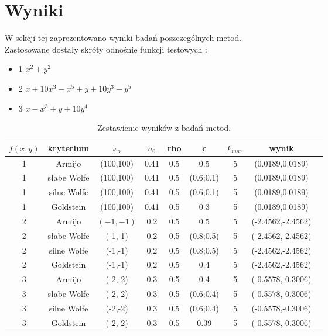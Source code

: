 \documentclass{classrep}
\begin{document}
\section{Wyniki}
W sekcji tej zaprezentowano wyniki badań poszczególnych metod.\\
Zastosowane dostały skróty odnośnie funkcji testowych :
\begin{itemize}
\item 1 $x^2+y^2$
\item 2 $x+10x^3-x^5 +y+10y^3-y^5$
\item 3 $x-x^3 +y+10y^4$
\end{itemize}


	\begin{table}[H]
		\begin{center}
\begin{tabular}{|c|c|c|c|c|c|c|c|c}
\hline $f(x,y)$ & kryterium & $x_o$ & $a_0$ & rho & c & $k_{max}$ & wynik\\ 
\hline 1 & Armijo & (100,100) & 0.41 & 0.5 & 0.5 & 5 &  (0.0189,0.0189) \\ 
\hline 1 & słabe Wolfe & (100,100) & 0.41 & 0.5 & (0.6;0.1) & 5 & (0.0189,0.0189) \\
\hline 1 & silne Wolfe & (100,100) & 0.41 & 0.5 & (0.6;0.1) & 5 & (0.0189,0.0189) \\
\hline 1 & Goldstein & (100,100) & 0.41 & 0.5 & 0.3 & 5 & (0.0189,0.0189) \\
\hline 2 & Armijo & $(-1,-1)$ & 0.2 & 0.5 & 0.5 & 5 &(-2.4562,-2.4562) \\ 
\hline 2 & słabe Wolfe & (-1,-1) & 0.2 & 0.5 & (0.8;0.5) & 5 &(-2.4562,-2.4562) \\ 
\hline 2 & silne Wolfe & (-1,-1) & 0.2 & 0.5 & (0.8;0.5) & 5 &(-2.4562,-2.4562) \\ 
\hline 2 & Goldstein & (-1,-1) & 0.2 & 0.5 & 0.4 & 5 &(-2.4562,-2.4562) \\ 
\hline 3 & Armijo & (-2,-2) & 0.3 & 0.5 & 0.4 & 5 & (-0.5578,-0.3006) \\ 
\hline 3 & słabe Wolfe & (-2,-2) & 0.3 & 0.5 & (0.6;0.4) & 5 & (-0.5578,-0.3006) \\ 
\hline 3 & silne Wolfe & (-2,-2) & 0.3 & 0.5 & (0.6;0.4) & 5 & (-0.5578,-0.3006) \\ 
\hline 3 & Goldstein & (-2,-2) & 0.3 & 0.5 & 0.39 & 5 & (-0.5578,-0.3006) \\ 
\hline 
\end{tabular} 

			\caption{Zestawienie wyników z badań metod.}
		\end{center}
	\end{table}
	
\end{document}
